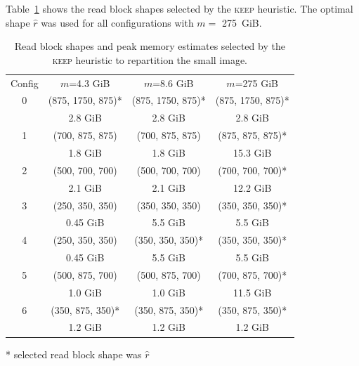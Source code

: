 \documentclass[sigconf, nonacm]{acmart}
\newcommand{\keep}[0]{\textsc{keep}\xspace}
\begin{document}
Table~\ref{tab:buffer_shapes} shows the read block shapes selected by the
\keep heuristic. The optimal shape $\hat r$ was used for all configurations with $m=$ 275~GiB.
  \begin{table}
    \centering
    \caption{Read block shapes and peak memory estimates selected by the
    \keep heuristic to repartition the small image.}
     \begin{tabular}[t]{cccc}
     \hline
     \rowcolor{black!25}
    Config &      $m$=4.3 GiB   & $m$=8.6 GiB     & $m$=275 GiB  \\
    0      &   (875, 1750, 875)* & (875, 1750, 875)* & (875, 1750, 875)* \\
           &    2.8 GiB         & 2.8  GiB        & 2.8  GiB             \\
           \rowcolor{black!10}
    1      &   (700, 875, 875)  & (700, 875, 875) & (875, 875, 875)* \\
           \rowcolor{black!10}
           &    1.8  GiB        & 1.8  GiB        & 15.3  GiB              \\
    2      &   (500, 700, 700)  & (500, 700, 700) & (700, 700, 700)* \\
           &    2.1  GiB        & 2.1  GiB        & 12.2  GiB             \\
           \rowcolor{black!10}
    3      &   (250, 350, 350)  & (350, 350, 350) & (350, 350, 350)* \\
           \rowcolor{black!10}
           &    0.45 GiB        & 5.5   GiB       & 5.5   GiB            \\
    4      &   (250, 350, 350)  & (350, 350, 350)* & (350, 350, 350)*  \\
           &    0.45 GiB        & 5.5  GiB        & 5.5   GiB            \\
           \rowcolor{black!10}
    5      &   (500, 875, 700)  & (500, 875, 700) & (700, 875, 700)* \\
           \rowcolor{black!10}
           &    1.0  GiB        & 1.0  GiB        & 11.5  GiB             \\
    6      &   (350, 875, 350)*  & (350, 875, 350)* & (350, 875, 350)* \\
           &    1.2  GiB        & 1.2  GiB        & 1.2   GiB            \\
     \hline
     \end{tabular}
     * selected read block shape was $\hat r$
     \label{tab:buffer_shapes}
  \end{table}
\end{document}
